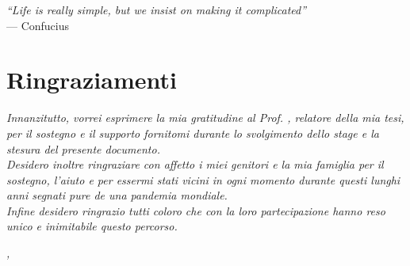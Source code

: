 \cleardoublepage
{}
{}

\begin{flushright}{
    \slshape
    ``Life is really simple, but we insist on making it complicated''} \\
    \medskip
    --- Confucius
\end{flushright}


\bigskip

\begingroup
\let\clearpage\relax
\let\cleardoublepage\relax
\let\cleardoublepage\relax

\chapter*{Ringraziamenti}

\noindent \textit{Innanzitutto, vorrei esprimere la mia gratitudine al Prof. \myProf, relatore della mia tesi, per il sostegno e il supporto fornitomi durante lo svolgimento dello stage e la stesura del presente documento.}\\

\noindent \textit{Desidero inoltre ringraziare con affetto i miei genitori e la mia famiglia per il sostegno,  l'aiuto e per essermi stati vicini in ogni momento durante questi lunghi anni segnati pure de una pandemia mondiale.}\\

\noindent \textit{Infine desidero ringrazio tutti coloro che con la loro partecipazione hanno reso unico e inimitabile questo percorso.}\\
\bigskip

\noindent\textit{\myLocation, \myTime}
\hfill \myName

\endgroup
